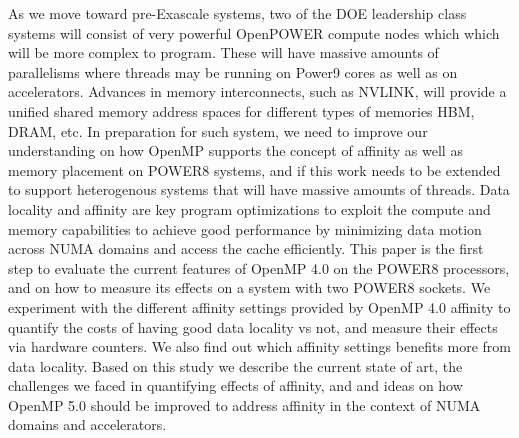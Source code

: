 As we move toward pre-Exascale systems, two of the DOE leadership class systems will consist of very powerful OpenPOWER compute nodes which which will be more complex to program. These will have massive amounts of parallelisms where threads may be running on Power9 cores as well as on accelerators. Advances in memory interconnects, such as NVLINK, will provide a unified shared memory address spaces for different types of memories HBM, DRAM, etc. In preparation for such system, we need to improve our understanding on how OpenMP supports the concept of affinity as well as memory placement on POWER8 systems, and if this work needs to be extended to support heterogenous systems that will have massive amounts of threads. Data locality and affinity are key 
program optimizations to exploit the compute and memory capabilities to achieve good performance by minimizing data motion across NUMA domains and access the cache efficiently. This  paper is the first step to evaluate the current features of OpenMP 4.0 on the POWER8 processors, and on how to measure its effects on a system with two POWER8 sockets. We experiment with the different affinity settings provided by OpenMP 4.0 affinity to quantify the costs of having good data locality vs not,  and measure their effects via hardware counters. We also find out which affinity settings benefits more from data locality. Based on this study we describe the current state of art, the challenges we faced in quantifying effects of affinity, and and ideas on how OpenMP 5.0 should be improved to address affinity in the context of NUMA domains and accelerators.

